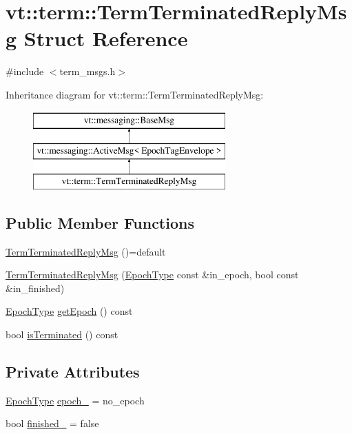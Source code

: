 \hypertarget{structvt_1_1term_1_1_term_terminated_reply_msg}{}\section{vt\+:\+:term\+:\+:Term\+Terminated\+Reply\+Msg Struct Reference}
\label{structvt_1_1term_1_1_term_terminated_reply_msg}


{\ttfamily \#include $<$term\+\_\+msgs.\+h$>$}

Inheritance diagram for vt\+:\+:term\+:\+:Term\+Terminated\+Reply\+Msg\+:\begin{figure}[H]
\begin{center}
\leavevmode
\includegraphics[height=3.000000cm]{structvt_1_1term_1_1_term_terminated_reply_msg}
\end{center}
\end{figure}
\subsection*{Public Member Functions}
\begin{DoxyCompactItemize}
\item 
\hyperlink{structvt_1_1term_1_1_term_terminated_reply_msg_ae20713dfddff3aa2e2d17a98b0dd8b9d}{Term\+Terminated\+Reply\+Msg} ()=default
\item 
\hyperlink{structvt_1_1term_1_1_term_terminated_reply_msg_ab59aabefa4f4bf9abb1e60433066a1ac}{Term\+Terminated\+Reply\+Msg} (\hyperlink{namespacevt_a81d11b28122d43bf9834577e4a06440f}{Epoch\+Type} const \&in\+\_\+epoch, bool const \&in\+\_\+finished)
\item 
\hyperlink{namespacevt_a81d11b28122d43bf9834577e4a06440f}{Epoch\+Type} \hyperlink{structvt_1_1term_1_1_term_terminated_reply_msg_a698733a686553c57a4da26f72fdfb9ab}{get\+Epoch} () const
\item 
bool \hyperlink{structvt_1_1term_1_1_term_terminated_reply_msg_abbac7b1c9254980d0d0c25e1959a6976}{is\+Terminated} () const
\end{DoxyCompactItemize}
\subsection*{Private Attributes}
\begin{DoxyCompactItemize}
\item 
\hyperlink{namespacevt_a81d11b28122d43bf9834577e4a06440f}{Epoch\+Type} \hyperlink{structvt_1_1term_1_1_term_terminated_reply_msg_a2e52a9c6dbc4156dba189704265773c6}{epoch\+\_\+} = no\+\_\+epoch
\item 
bool \hyperlink{structvt_1_1term_1_1_term_terminated_reply_msg_a7d5f6264f595981386a08aefee4178f1}{finished\+\_\+} = false
\end{DoxyCompactItemize}
